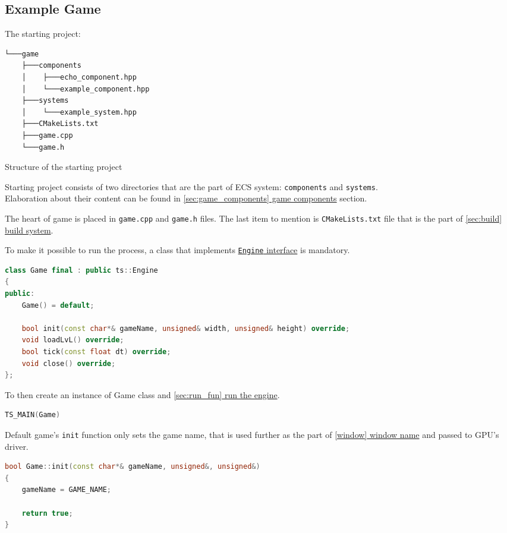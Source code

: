 \newpage
\subsection{Example Game}
\hspace{\parindent}The starting project:
\begin{verbatim}
└───game
    ├───components
    │    ├───echo_component.hpp
    │    └───example_component.hpp
    ├───systems
    │    └───example_system.hpp
    ├───CMakeLists.txt
    ├───game.cpp
    └───game.h
\end{verbatim}
\begin{table}[h]
\caption{Structure of the starting project}
\end{table}

Starting project consists of two directories that are the part of ECS system: \texttt{components} and \texttt{systems}.\\Elaboration about their content can be found in \hyperref[sec:game_components]{\ref*{sec:game_components} game components} section.

The heart of game is placed in \texttt{game.cpp} and \texttt{game.h} files. The last item to mention is \texttt{CMakeLists.txt} file that is the part of \hyperref[sec:build]{\ref*{sec:build} build system}.

To make it possible to run the process, a class that implements \hyperref[sec:engine_class]{\texttt{Engine} interface} is mandatory. 
\begin{lstlisting}[language=c++, caption=An example of a game class header (./game/game.h)]
class Game final : public ts::Engine
{
public:
    Game() = default;

    bool init(const char*& gameName, unsigned& width, unsigned& height) override;
    void loadLvL() override;
    bool tick(const float dt) override;
    void close() override;
};
\end{lstlisting}
To then create an instance of Game class and \hyperref[sec:run_fun]{\ref*{sec:run_fun} run the engine}.
\begin{lstlisting}[language=c++, caption=A game instance (./game/game.cpp)]
TS_MAIN(Game)
\end{lstlisting}
Default game's \texttt{init} function only sets the game name, that is used further as the part of \hyperref[window]{\ref*{window} window name} and passed to GPU's driver.
\begin{lstlisting}[language=c++, caption=An example of a game \texttt{init} function (./game/game.cpp)]
bool Game::init(const char*& gameName, unsigned&, unsigned&)
{
    gameName = GAME_NAME;

    return true;
}
\end{lstlisting}


